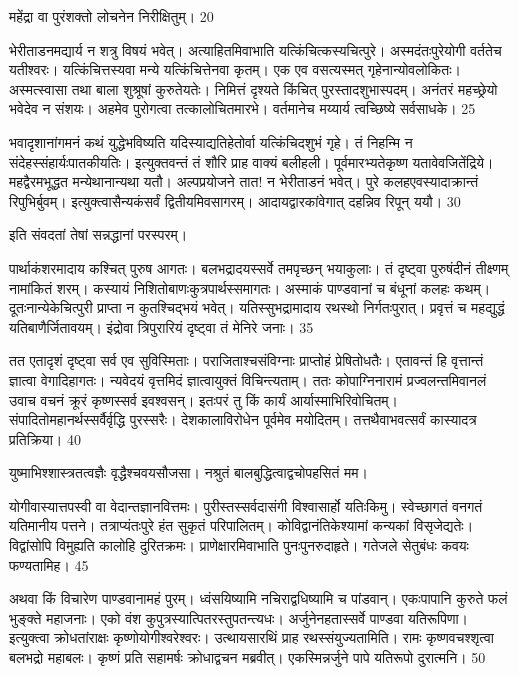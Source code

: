 महेंद्रा वा पुरंशक्तो लोचनेन निरीक्षितुम्।
20

भेरीताडनमद्यार्य न शत्रु विषयं भवेत्।
अत्याहितमिवाभाति यत्किंचित्कस्यचित्पुरे।
अस्मदंतःपुरेयोगी वर्ततेच यतीश्वरः।
यत्किंचित्तस्यवा मन्ये यत्किंचित्तेनवा कृतम्।
एक एव वसत्यस्मत् गृहेनान्योवलोकितः।
अस्मत्स्वासा तथा बाला शुश्रूषां कुरुतेयतेः।
निमित्तं दृश्यते किंचित् पुरस्तादशुभास्पदम्।
अनंतरं महच्छ्रेयो भवेदेव न संशयः।
अहमेव पुरोगत्वा तत्कालोचितमारभे।
वर्तमानेच मय्यार्य त्वच्छिष्ये सर्वसाधके।
25

भवादृशानांगमनं कथं युद्धेभविष्यति यदिस्याद्यतिहेतोर्वा यत्किंचिदशुभं गृहे।
तं निहन्मि न संदेहस्संहार्यःपातकीयतिः।
इत्युक्तवन्तं तं शौरि प्राह वाक्यं बलीहली।
पूर्वमारभ्यतेकृष्ण यतावेवजितेंद्रिये।
महद्वैरमभूद्धत मन्येथानान्यथा यतौ।
अल्पप्रयोजने तात! न भेरीताडनं भवेत्।
पुरे कलहएवस्यादाक्रान्तं रिपुभिर्बुवम्।
इत्युक्त्वासैन्यकंसर्वं द्वितीयमिवसागरम्।
आदायद्वारकांवेगात् दहन्निव रिपून् ययौ।
30

इति संवदतां तेषां सन्नद्धानां परस्परम्।

पार्थाकंशरमादाय कश्चित् पुरुष आगतः।
बलभद्रादयस्सर्वे तमपृच्छन् भयाकुलाः।
तं दृष्ट्वा पुरुषंदीनं तीक्ष्णम् नामांकितं शरम्।
कस्यायं निशितोबाणःकुत्रपार्थस्समागतः।
अस्माकं पाण्डवानां च बंधूनां कलहः कथम्।
दूतःनान्येकेचित्पुरी प्राप्ता न कुतश्चिद्भयं भवेत्।
यतिस्सुभद्रामादाय रथस्थो निर्गतःपुरात्।
प्रवृत्तं च महद्युद्धं यतिबाणैर्जितावयम्।
इंद्रोवा त्रिपुरारियं दृष्ट्वा तं मेनिरे जनाः।
35

तत एतादृशं दृष्ट्वा सर्व एव सुविस्मिताः।
पराजिताश्चसंविग्नाः प्राप्तोहं प्रेषितोधतैः।
एतावन्तं हि वृत्तान्तं ज्ञात्वा वेगादिहागतः।
न्यवेदयं वृत्तमिदं ज्ञात्वायुक्तं विचिन्त्यताम्।
ततः कोपाग्निनारामं प्रज्वलन्तमिवानलं उवाच वचनं क्रूरं कृष्णस्सर्व इवश्वसन्।
इतःपरं तु किं कार्यं आर्यास्माभिरिवोचितम्।
संपादितोमहानर्थस्सर्वैर्वृद्धि पुरस्सरैः।
देशकालाविरोधेन पूर्वमेव मयोदितम्।
तत्तथैवाभवत्सर्वं कास्यादत्र प्रतिक्रिया।
40

युष्माभिश्शास्त्रतत्वज्ञैः वृद्धैश्चवयसौजसा।
नश्रुतं बालबुद्धित्वाद्वचोपहसितं मम।

योगीवास्यात्तपस्वी वा वेदान्तज्ञानवित्तमः।
पुरीस्तस्सर्वदासंगी विश्वासार्हो यतिःकिमु।
स्वेच्छागतं वनगतं यतिमानीय पत्तने।
तत्राप्यंतःपुरे हंत सुकृतं परिपालितम्।
कोविद्वानंतिकेश्यामां कन्यकां विसृजेद्यतेः।
विद्वांसोपि विमुह्यति कालोहि दुरितक्रमः।
प्राणेक्षारमिवाभाति पुनःपुनरुदाहृते।
गतेजले सेतुबंधः कवयः फण्यतामिह।
45

अथवा किं विचारेण पाण्डवानामहं पुरम्।
ध्वंसयिष्यामि नचिराद्वधिष्यामि च पांडवान्।
एकःपापानि कुरुते फलं भुङ्क्ते महाजनाः।
एको वंश कुपुत्रस्यात्पितरस्तुपतन्त्यधः।
अर्जुनेनहतास्सर्वे पाण्डवा यतिरूपिणा।
इत्युक्त्वा क्रोधतांराक्षः कृष्णोयोगीश्वरेश्वरः।
उत्थायसारथिं प्राह रथस्संयुज्यतामिति।
रामः कृष्णवचश्शृत्वा बलभद्रो महाबलः।
कृष्णं प्रति सहामर्षः क्रोधाद्वचन मब्रवीत्।
एकस्मिन्नर्जुने पापे यतिरूपो दुरात्मनि।
50

